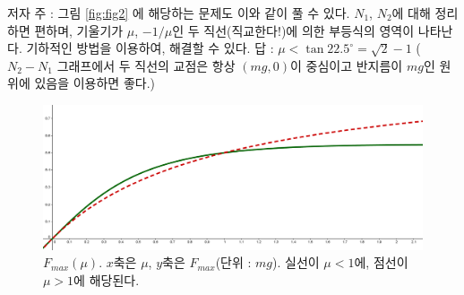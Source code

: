 \documentclass[11pt]{article}
\begin{document}
저자 주 : 그림 \ref{fig:fig2} 에 해당하는 문제도 이와 같이 풀 수 있다. $N_{1}$, $N_{2}$에 대해 정리하면 편하며, 기울기가 $\mu$, $-1/\mu$인 두 직선(직교한다!)에 의한 부등식의 영역이 나타난다. 기하적인 방법을 이용하여, 해결할 수 있다. 답 : $\mu < \tan{22.5^{\circ}} = \sqrt{2}-1$ ($ N_{2}-N_{1} $ 그래프에서 두 직선의 교점은 항상 $ (mg,0) $이 중심이고 반지름이 $ mg $인 원 위에 있음을 이용하면 좋다.)
\begin{figure}[b]
	\centering
	\includegraphics[width=.5\linewidth]{answer_v4.png}
	\caption{$F_{max}(\mu)$. $x$축은 $\mu$, $y$축은 $F_{max}$(단위 : $mg$). 실선이 $\mu<1$에, 점선이 $\mu>1$에 해당된다.}
	\label{answergraph}
\end{figure}
\end{document}
